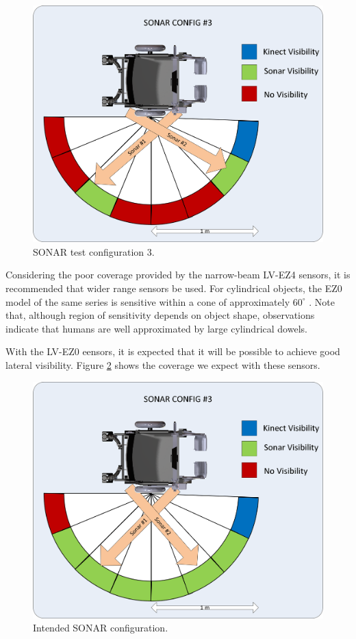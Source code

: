 \documentclass[oneside,final]{report}
\begin{document}
\begin{figure}[hbt]
 \centering
 \includegraphics[scale=0.6]{SONAR_Config3.png}
 \caption{SONAR test configuration 3.}
 \label{sonar_3}
\end{figure}

Considering the poor coverage provided by the narrow-beam LV-EZ4 sensors, it is recommended that wider range sensors be used.  For cylindrical objects, the EZ0 model of the same series is sensitive within a cone of approximately $60^\circ$ \cite{lv-ez0}.  Note that, although region of sensitivity depends on object shape, observations indicate that humans are well approximated by large cylindrical dowels.  

With the LV-EZ0 eensors, it is expected that it will be possible to achieve good lateral visibility. Figure \ref{sonar_final} shows the coverage we expect with these sensors.

\begin{figure}[hbt]
 \centering
 \includegraphics[scale=0.6]{SONAR_Config_Final.png}
 \caption{Intended SONAR configuration.}
 \label{sonar_final}
\end{figure}
\end{document}
